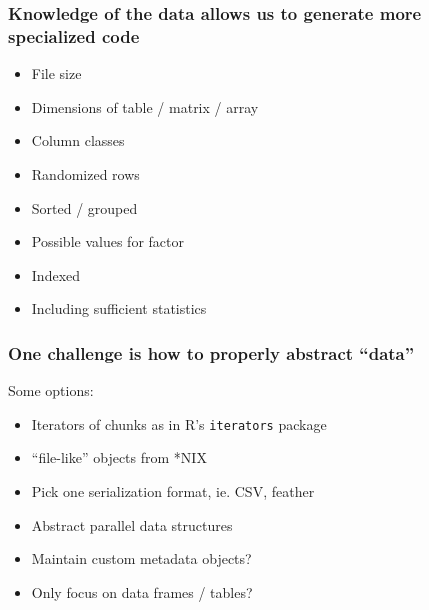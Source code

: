 \documentclass{beamer}
\begin{document}
\begin{frame}

    \frametitle{Knowledge of the data allows us to generate more specialized code}

    \begin{itemize}

	\item File size
	\item Dimensions of table / matrix / array
	\item Column classes
	\item Randomized rows
	\item Sorted / grouped
	\item Possible values for factor
	\item Indexed
	\item Including sufficient statistics

    \end{itemize}


\end{frame}
\begin{frame}[fragile]

    \frametitle{One challenge is how to properly abstract ``data''}

    Some options:

    \begin{itemize}
        \item Iterators of chunks as in R's \texttt{iterators} package
        \item ``file-like'' objects from *NIX
        \item Pick one serialization format, ie. CSV, feather
        \item Abstract parallel data structures
    \end{itemize}

    \pause

    \begin{itemize}
        \item Maintain custom metadata objects?
        \item Only focus on data frames / tables?
    \end{itemize}

\end{frame}
\end{document}
